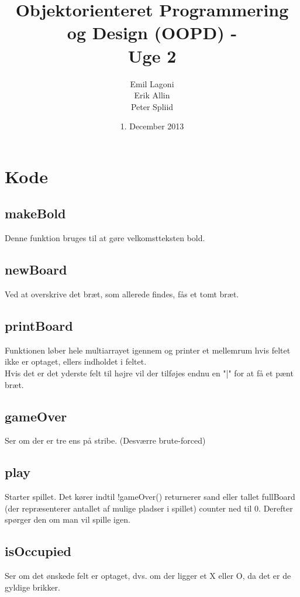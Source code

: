 \documentclass[a4paper,12pt]{article}
\title{Objektorienteret Programmering og Design (OOPD) - \\ Uge 2}
\author{Emil Lagoni \\ Erik Allin \\ Peter Spliid}
\date{1. December 2013}
\begin{document}
\maketitle %
\thispagestyle{empty}
\setcounter{page}{0}
\newpage


\section*{Kode}
\subsection*{makeBold}
Denne funktion bruges til at gøre velkomstteksten bold.


\subsection*{newBoard}
Ved at overskrive det bræt, som allerede findes, fås et tomt bræt.


\subsection*{printBoard}
Funktionen løber hele multiarrayet igennem og printer et mellemrum hvis feltet 
ikke er optaget, ellers indholdet i feltet.\\
Hvis det er det yderste felt til højre vil der tilføjes endnu en "|" for at få
et pænt bræt.


\subsection*{gameOver}
Ser om der er tre ens på stribe. (Desværre brute-forced)


\subsection*{play}
Starter spillet. Det kører indtil !gameOver() returnerer sand eller tallet fullBoard (der repræsenterer antallet af mulige pladser i spillet) counter ned til 0. Derefter spørger den om man vil spille igen.

\subsection*{isOccupied}
Ser om det ønskede felt er optaget, dvs. om der ligger et X eller O, da det er de gyldige brikker.
\end{document}
